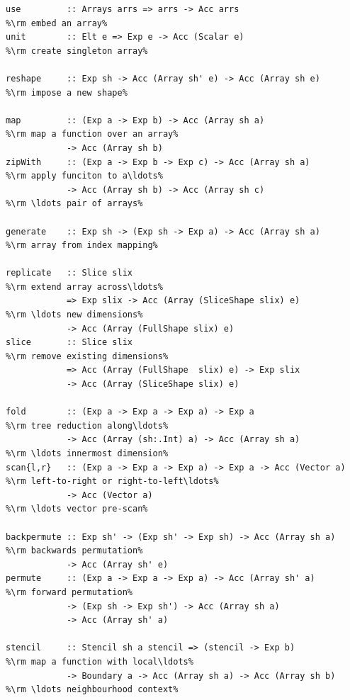 \begin{lstlisting}[style=haskell_float,
    numbers=none,
    float=t,
    label={lst:acc_operations},
    caption={[Core Accelerate array operations] Summary of Accelerate's core
        collective array operations, omitting \code{Shape} and \code{Elt} class
        constraints for brevity. In addition, there are other flavours of folds
        and scans as well as segmented versions of these.}]
use         :: Arrays arrs => arrs -> Acc arrs                        %\rm embed an array%
unit        :: Elt e => Exp e -> Acc (Scalar e)                       %\rm create singleton array%

reshape     :: Exp sh -> Acc (Array sh' e) -> Acc (Array sh e)        %\rm impose a new shape%

map         :: (Exp a -> Exp b) -> Acc (Array sh a)                   %\rm map a function over an array%
            -> Acc (Array sh b)
zipWith     :: (Exp a -> Exp b -> Exp c) -> Acc (Array sh a)          %\rm apply funciton to a\ldots%
            -> Acc (Array sh b) -> Acc (Array sh c)                   %\rm \ldots pair of arrays%

generate    :: Exp sh -> (Exp sh -> Exp a) -> Acc (Array sh a)        %\rm array from index mapping%

replicate   :: Slice slix                                             %\rm extend array across\ldots%
            => Exp slix -> Acc (Array (SliceShape slix) e)            %\rm \ldots new dimensions%
            -> Acc (Array (FullShape slix) e)
slice       :: Slice slix                                             %\rm remove existing dimensions%
            => Acc (Array (FullShape  slix) e) -> Exp slix
            -> Acc (Array (SliceShape slix) e)

fold        :: (Exp a -> Exp a -> Exp a) -> Exp a                     %\rm tree reduction along\ldots%
            -> Acc (Array (sh:.Int) a) -> Acc (Array sh a)            %\rm \ldots innermost dimension%
scan{l,r}   :: (Exp a -> Exp a -> Exp a) -> Exp a -> Acc (Vector a)   %\rm left-to-right or right-to-left\ldots%
            -> Acc (Vector a)                                         %\rm \ldots vector pre-scan%

backpermute :: Exp sh' -> (Exp sh' -> Exp sh) -> Acc (Array sh a)     %\rm backwards permutation%
            -> Acc (Array sh' e)
permute     :: (Exp a -> Exp a -> Exp a) -> Acc (Array sh' a)         %\rm forward permutation%
            -> (Exp sh -> Exp sh') -> Acc (Array sh a)
            -> Acc (Array sh' a)

stencil     :: Stencil sh a stencil => (stencil -> Exp b)             %\rm map a function with local\ldots%
            -> Boundary a -> Acc (Array sh a) -> Acc (Array sh b)     %\rm \ldots neighbourhood context%
\end{lstlisting}

